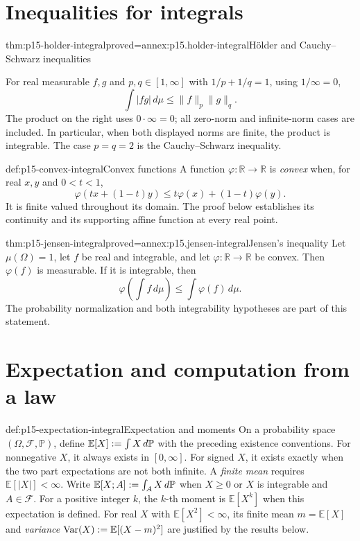 \section{Inequalities for integrals}
\label{sec:p15-integral-inequalities}

\begin{hbtheorem}{thm:p15-holder-integral}{proved=annex:p15.holder-integral}{H\"older and Cauchy--Schwarz inequalities}
\par\nobreak
For real measurable \(f,g\) and \(p,q\in[1,\infty]\) with
\(1/p+1/q=1\), using \(1/\infty=0\),
\[
 \int|fg|\,d\mu\leq\|f\|_p\|g\|_q.
\]
The product on the right uses \(0\cdot\infty=0\); all zero-norm
and infinite-norm cases are included. In particular, when both displayed
norms are finite, the product is integrable. The case \(p=q=2\) is
the Cauchy--Schwarz inequality.
\end{hbtheorem}

\begin{hbdefinition}{def:p15-convex-integral}{Convex functions}
A function \(\varphi:\mathbb R\to\mathbb R\) is \emph{convex}
when, for real \(x,y\) and \(0<t<1\),
\[
 \varphi(tx+(1-t)y)\leq t\varphi(x)+(1-t)\varphi(y).
\]
It is finite valued throughout its domain. The proof below establishes
its continuity and its supporting affine function at every real point.
\end{hbdefinition}

\begin{hbtheorem}{thm:p15-jensen-integral}{proved=annex:p15.jensen-integral}{Jensen's inequality}
Let \(\mu(\Omega)=1\), let \(f\) be real and integrable, and let
\(\varphi:\mathbb R\to\mathbb R\) be convex. Then \(\varphi(f)\)
is measurable. If it is integrable, then
\[
 \varphi\left(\int f\,d\mu\right)\leq\int\varphi(f)\,d\mu.
\]
The probability normalization and both integrability hypotheses are part
of this statement.
\end{hbtheorem}

\section{Expectation and computation from a law}
\label{sec:p15-general-expectation}

\begin{hbdefinition}{def:p15-expectation-integral}{Expectation and moments}
On a probability space \((\Omega,\mathcal F,\mathbb P)\), define
\(\mathbb E[X]\mathrel{:=}\int X\,d\mathbb P\) with the preceding
existence conventions. For nonnegative \(X\), it always exists in
\([0,\infty]\). For signed \(X\), it exists exactly when the two
part expectations are not both infinite. A \emph{finite mean} requires
\(\mathbb E[|X|]<\infty\). Write
\(\mathbb E[X;A]\mathrel{:=}\int_A X\,d\mathbb P\) when \(X\geq0\)
or \(X\) is integrable and \(A\in\mathcal F\).
For a positive integer \(k\), the \(k\)-th moment is
\(\mathbb E[X^k]\) when this expectation is defined.
For real \(X\) with \(\mathbb E[X^2]<\infty\), its finite mean
\(m=\mathbb E[X]\) and \emph{variance}
\(\operatorname{Var}(X)\mathrel{:=}\mathbb E[(X-m)^2]\) are justified
by the results below.
\end{hbdefinition}

